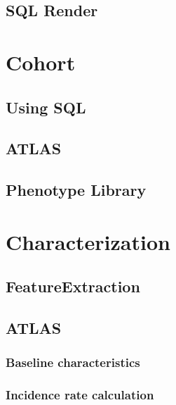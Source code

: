 \documentclass[]{book}
\begin{document}
\hypertarget{sql-render}{%
\section{SQL Render}\label{sql-render}}

\hypertarget{cohort}{%
\chapter{Cohort}\label{cohort}}

\hypertarget{using-sql}{%
\section{Using SQL}\label{using-sql}}

\hypertarget{atlas}{%
\section{ATLAS}\label{atlas}}

\hypertarget{phenotype-library}{%
\section{Phenotype Library}\label{phenotype-library}}

\hypertarget{characterization}{%
\chapter{Characterization}\label{characterization}}

\hypertarget{featureextraction}{%
\section{FeatureExtraction}\label{featureextraction}}

\hypertarget{atlas-1}{%
\section{ATLAS}\label{atlas-1}}

\hypertarget{baseline-characteristics}{%
\subsection{Baseline characteristics}\label{baseline-characteristics}}

\hypertarget{incidence-rate-calculation}{%
\subsection{Incidence rate calculation}\label{incidence-rate-calculation}}
\end{document}
